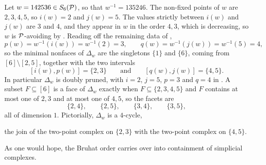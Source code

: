 \begin{example}
\label{ex: 142536}
    Let $w = 142536 \in S_6(\mathcal{P})$, so that $w^{-1} = 135246$. The non-fixed points
    of $w$ are $2,3,4,5$, so $i(w) = 2$ and $j(w) = 5$. The values strictly between
    $i(w)$ and $j(w)$ are $3$ and $4$, and they appear in $w$ in the order $4,3$,
    which is decreasing, so $w$ is $\mathcal{P}$-avoiding by
    . Reading off the remaining data of
    ,
    \[
    p(w) = w^{-1}(i(w)) = w^{-1}(2) = 3,
    \qquad
    q(w) = w^{-1}(j(w)) = w^{-1}(5) = 4,
    \]
    so the minimal nonfaces of $\Delta_w$ are the singletons $\{1\}$ and $\{6\}$,
    coming from $[6]\setminus[2,5]$, together with the two intervals
    \[
    [i(w),p(w)] = \{2,3\}
    \qquad\text{and}\qquad
    [q(w),j(w)] = \{4,5\}.
    \]
    In particular $\Delta_w$ is doubly pruned, with $i = 2$, $j = 5$, $p = 3$ and
    $q = 4$ in . A subset
    $F\subseteq[6]$ is a face of $\Delta_w$ exactly when $F\subseteq\{2,3,4,5\}$ and
    $F$ contains at most one of $2,3$ and at most one of $4,5$, so the facets are
    \[
    \{2,4\},\qquad \{2,5\},\qquad \{3,4\},\qquad \{3,5\},
    \]
    all of dimension $1$. Pictorially, $\Delta_w$ is a $4$-cycle,
    \begin{center}
    \end{center}
    the join of the two-point complex on $\{2,3\}$ with the two-point complex on
    $\{4,5\}$.
\end{example}
As one would hope, the Bruhat order carries over into containment of simplicial complexes.

